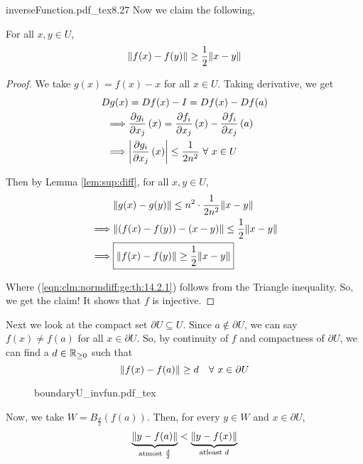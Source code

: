 \documentclass[../Analysis-3.tex]{subfiles}
\begin{document}
\begin{proofFig}{\def\svgwidth{1.4in}
    {inverseFunction.pdf_tex}}{}{\label{fig:inf:fun}}{8}{.27\textwidth}
  Now we claim the following,
  \begin{clmBox}
    For all $ x, y \in U $,
    \[  \norm{f(x)-f(y)} \geq \frac{1}{2}\norm{x-y}  \]
  \end{clmBox}

  \begin{proof}
    We take $ g(x) = f(x) - x $ for all $ x \in U $. Taking derivative, we get
    \begin{align*}
      Dg(x)    & = Df(x) - I  = Df(x) - Df(a)                                                                     \\
      \implies & \pdv{g_i}{x_j}\left( x \right) = \pdv{f_i}{x_j}\left( x \right) - \pdv{f_i}{x_j}\left( a \right) \\
      \implies & \abs{\pdv{g_i}{x_j}\left( x \right)} \leq \frac{1}{2n^2} \ \forall\ x \in U
    \end{align*}

    Then by Lemma \ref{lem:sup:diff}, for all $ x, y \in U $,
    \begin{align}
               & \norm{g(x)-g(y)} \leq n^2\cdot\frac{1}{2n^2}\norm{x-y} \nonumber                          \\
      \implies & \norm{(f(x)-f(y)) - (x-y)} \leq \frac{1}{2}\norm{x-y}  \nonumber                          \\
      \implies & \boxed{\norm{f(x)-f(y)} \geq \frac{1}{2}\norm{x-y}} \label{eqn:clm:normdiff:ge:th:14.2.1}
    \end{align}

    Where (\ref{eqn:clm:normdiff:ge:th:14.2.1}) follows from the Triangle inequality. So, we get the claim! It shows that $ f $ is injective.
  \end{proof}

  Next we look at the compact set $ \partial U \subseteq U $. Since $ a \not\in \partial U $, we can say $ f(x) \not= f(a) $ for all $ x \in \partial U $. So, by continuity of $ f $ and compactness of $ \partial U $,  we can find a $ d \in \mathbb{R}_{\geq 0} $ such that
  \[  \norm{f(x)-f(a)} \geq d \quad \forall\ x \in \partial U \]

  \begin{figure}[h]
    \centering
    \def\svgwidth{5.4in}
    {boundaryU_invfun.pdf_tex}
    \caption{}
    \label{fig:boundaryU_invfun}
  \end{figure}

  Now, we take $ W = B_{\frac{d}{2}}\left( f(a) \right) $. Then, for every $ y \in W $ and $ x \in \partial U $,
  \begin{equation}\label{eqn:normdist:ytofa:ytofx:th:14.2.1}
    \underbrace{\norm{y-f(a)}}_{\text{atmost } \frac{d}{2}} < \underbrace{\norm{y-f(x)}}_{\text{atleast } d}
  \end{equation}



\end{proofFig}
\end{document}
